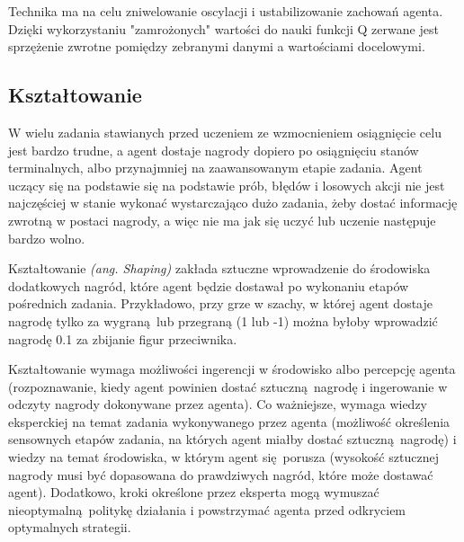 Technika ma na celu zniwelowanie oscylacji i ustabilizowanie zachowań agenta. Dzięki wykorzystaniu "zamrożonych" wartości do nauki funkcji Q zerwane jest sprzężenie zwrotne pomiędzy zebranymi danymi a wartościami docelowymi.

\subsection{Kształtowanie}

W wielu zadania stawianych przed uczeniem ze wzmocnieniem osiągnięcie celu jest bardzo trudne, a agent dostaje nagrody dopiero po osiągnięciu stanów terminalnych, albo przynajmniej na zaawansowanym etapie zadania. Agent uczący się na podstawie się na podstawie prób, błędów i losowych akcji nie jest najczęściej w stanie wykonać wystarczająco dużo zadania, żeby dostać informację zwrotną w postaci nagrody, a więc nie ma jak się uczyć lub uczenie następuje bardzo wolno.

Kształtowanie \textit{(ang. Shaping)} zakłada sztuczne wprowadzenie do środowiska dodatkowych nagród, które agent będzie dostawał po wykonaniu etapów pośrednich zadania. Przykładowo, przy grze w szachy, w której agent dostaje nagrodę tylko za wygraną lub przegraną (1 lub -1) można byłoby wprowadzić nagrodę 0.1 za zbijanie figur przeciwnika.

Kształtowanie wymaga możliwości ingerencji w środowisko albo percepcję agenta (rozpoznawanie, kiedy agent powinien dostać sztuczną nagrodę i ingerowanie w odczyty nagrody dokonywane przez agenta). Co ważniejsze, wymaga wiedzy eksperckiej na temat zadania wykonywanego przez agenta (możliwość określenia sensownych etapów zadania, na których agent miałby dostać sztuczną nagrodę) i wiedzy na temat środowiska, w którym agent się porusza (wysokość sztucznej nagrody musi być dopasowana do prawdziwych nagród, które może dostawać agent). Dodatkowo, kroki określone przez eksperta mogą wymuszać nieoptymalną politykę działania i powstrzymać agenta przed odkryciem optymalnych strategii.
